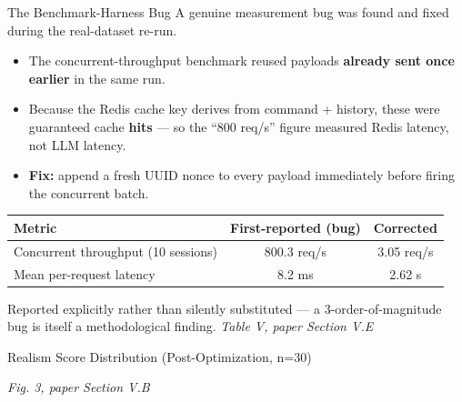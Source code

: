 \documentclass[aspectratio=169, 11pt]{beamer}
\newcommand{\srcnote}[1]{{\footnotesize\color{gray}\textit{#1}}}
\begin{document}
\begin{frame}{The Benchmark-Harness Bug}
    A genuine measurement bug was found and fixed during the real-dataset re-run.
    \begin{itemize}
        \item The concurrent-throughput benchmark reused payloads \textbf{already sent once earlier} in the same run.
        \item Because the Redis cache key derives from command + history, these were guaranteed cache \textbf{hits} --- so the ``800 req/s'' figure measured Redis latency, not LLM latency.
        \item \textbf{Fix:} append a fresh UUID nonce to every payload immediately before firing the concurrent batch.
    \end{itemize}
    \vspace{2mm}
    \scriptsize
    \renewcommand{\arraystretch}{1.2}
    \begin{tabular}{|l|c|c|}
        \hline
        \textbf{Metric} & \textbf{First-reported (bug)} & \textbf{Corrected} \\
        \hline
        Concurrent throughput (10 sessions) & 800.3 req/s & 3.05 req/s \\
        \hline
        Mean per-request latency & 8.2 ms & 2.62 s \\
        \hline
    \end{tabular}
    \vspace{2mm}

    \footnotesize Reported explicitly rather than silently substituted --- a 3-order-of-magnitude bug is itself a methodological finding.
    \vspace{1mm}
    \srcnote{Table V, paper Section V.E}
\end{frame}

\begin{frame}{Realism Score Distribution (Post-Optimization, n=30)}
    \begin{center}
    \end{center}
    \srcnote{Fig. 3, paper Section V.B}
\end{frame}
\end{document}
